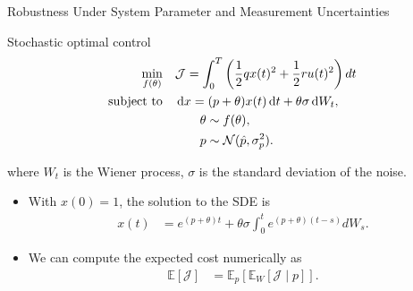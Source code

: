 \begin{frame}{Robustness Under System Parameter and Measurement Uncertainties}
  \begin{small}
    \begin{exampleblock}{Stochastic optimal control}
        \begin{equation*}
          \begin{aligned}
            \underset{f(\theta)}{\text{min}} 
            &\quad \mathcal{J} = \int_0^T \left(\frac{1}{2}qx(t)^2 + \frac{1}{2}ru(t)^2 \right) dt \\
            \text{subject to} 
            &\quad \operatorname{d}\! x = (p+\theta)x(t) \operatorname{d}\! t + \theta\sigma \operatorname{d}\! W_t,\\
            &\quad \hspace{0.7cm} \theta \sim f(\theta), \\ 
            &\quad \hspace{0.7cm} p \sim \mathcal{N}(\hat{p}, \sigma_p^2).  
            \end{aligned}       
        \end{equation*}
  \end{exampleblock}
\end{small}
\hspace{-3.0cm}where $W_t$ is the Wiener process, $\sigma$ is the standard deviation of the
noise. 
\begin{itemize}
  \item With $x(0) = 1$, the solution to the SDE is 
  \begin{align*}
    x(t) &= e^{(p+\theta)t} + \theta\sigma \int_0^t e^{(p+\theta)(t-s)}dW_s.
  \end{align*}
  \item We can compute the expected cost numerically as 
  \begin{align*}
    \mathbb{E}[\mathcal{J}] &= \mathbb{E}_p[\mathbb{E}_W[\mathcal{J} \mid p]].
  \end{align*}
\end{itemize}
\end{frame}


